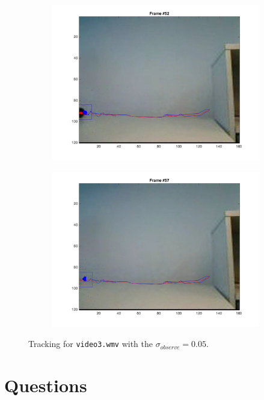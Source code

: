 \documentclass{ethz_report}
\begin{document}
\begin{figure}[h]
\begin{subfigure}[b]{.25\textwidth}
        \includegraphics[width=1\linewidth]{images/video3_observe_low_51}
    \end{subfigure}%
    \begin{subfigure}[b]{.25\textwidth}
        \centering
        \includegraphics[width=1\linewidth]{images/video3_observe_low_56}
    \end{subfigure}
    \caption{Tracking for \texttt{video3.wmv} with the $\sigma_{observe} = 0.05$.}
    \label{fig:tracking_video3_observe_low}
\end{figure}

\section*{Questions}
\end{document}
